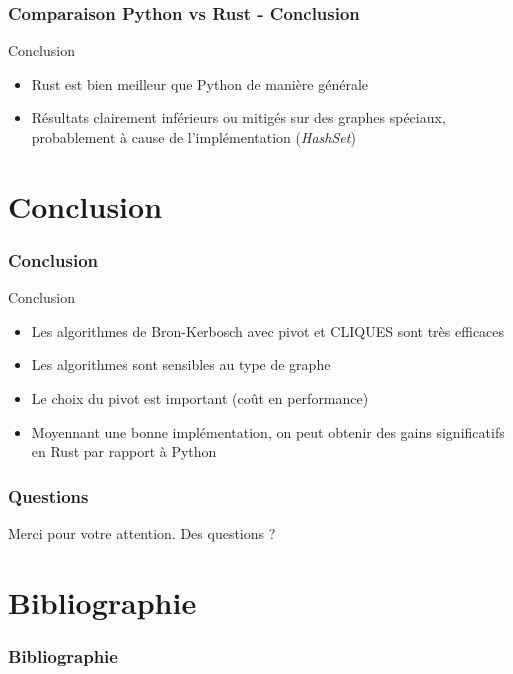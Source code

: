 \documentclass{beamer}
\begin{document}
\begin{frame}
\frametitle{Comparaison Python vs Rust - Conclusion}
\begin{block}{Conclusion}
\begin{itemize}
  \item Rust est bien meilleur que Python de manière générale
  \item Résultats clairement inférieurs ou mitigés sur des graphes spéciaux, probablement à cause de l'implémentation (\emph{HashSet})
\end{itemize}
\end{block}
\end{frame}
\section{Conclusion}
\begin{frame}
\frametitle{Conclusion}
\begin{block}{Conclusion}
  \begin{itemize}
    \item Les algorithmes de Bron-Kerbosch avec pivot et CLIQUES sont très efficaces
    \item Les algorithmes sont sensibles au type de graphe
    \item Le choix du pivot est important (coût en performance)
    \item Moyennant une bonne implémentation, on peut obtenir des gains significatifs en Rust par rapport à Python
  \end{itemize}
\end{block}
\end{frame}

\begin{frame}
\frametitle{Questions}
Merci pour votre attention. Des questions ?
\end{frame}

\section{Bibliographie}
\begin{frame}[allowframebreaks]
\frametitle{Bibliographie}
\printbibliography
\end{frame}
\end{document}
